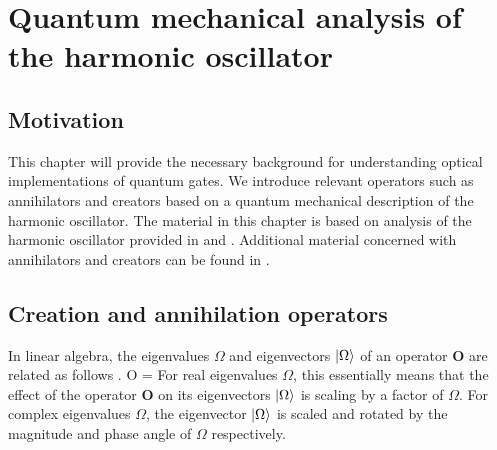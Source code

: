 \chapter{Quantum mechanical analysis of the harmonic oscillator\label{ch:qmech}}

\section{Motivation}
This chapter will provide the necessary background for understanding optical implementations of quantum gates. We introduce relevant operators such as annihilators and creators based on a quantum mechanical description of the harmonic oscillator. The material in this chapter is based on analysis of the harmonic oscillator provided in \cite{goldstein} and \cite{griffiths}. Additional material concerned with annihilators and creators can be found in \cite{klm}.

\section{Creation and annihilation operators\label{annihilators}}

In linear algebra, the eigenvalues $\Omega$ and eigenvectors $|\Omega\rangle$ of an operator $\boldsymbol O$ are related as follows \cite{linalg}.
\beq
\boldsymbol O\ket{\Omega} = \Omega\ket{\Omega}
\eeq
For real eigenvalues $\Omega$, this essentially means that the effect of the operator $\boldsymbol O$ on its eigenvectors $|\Omega\rangle$ is scaling by a factor of $\Omega$. For complex eigenvalues $\Omega$, the eigenvector $|\Omega\rangle$ is scaled and rotated by the magnitude and phase angle of $\Omega$ respectively. 

